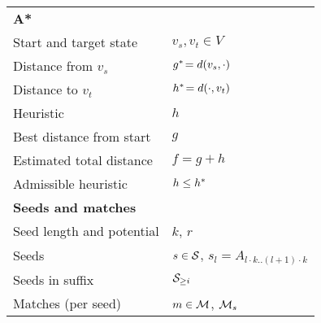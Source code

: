 \newcommand*{\tabindent}{\hspace{3mm}}
\begin{table}[h]
  \centering
  \begin{tabular}{ll}
	\hline
	\textbf{A*} & \\
	\tabindent Start and target state& $v_s, v_t \in V$\\
	\tabindent Distance from $v_s$ & $g^*\! = d(v_s, \cdot)$\\
	\tabindent Distance to $v_t$& $h^*\! = d(\cdot, v_t)$\\
	\tabindent Heuristic & $h$\\
	\tabindent Best distance from start & $g$  \\
	\tabindent Estimated total distance & $f = g + h$\\
	\tabindent Admissible heuristic & $h \leq h^*\!$\\
	\hline
	\multicolumn{2}{l}{\textbf{Seeds and matches}} \\
	\tabindent Seed length and potential & $k$, $r$ \\
	\tabindent Seeds & $s\in \mathcal S$, $s_l = A_{l \cdot k..(l+1)\cdot k}$ \\
	\tabindent Seeds in suffix & $\mathcal S_{\geq i}$ \\
	\tabindent Matches (per seed)& $m \in \mathcal M$, $\mathcal M_s$\\

\end{tabular}
\end{table}

